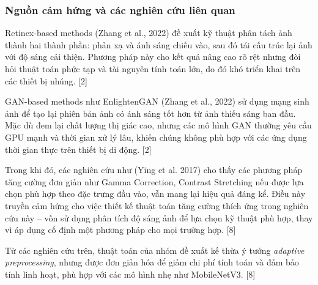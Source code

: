 \subsubsection{Nguồn cảm hứng và các nghiên cứu liên quan} %

Retinex-based methods (Zhang et al., 2022) đề xuất kỹ thuật phân tách ảnh thành hai thành phần: phản xạ và ánh sáng chiếu vào, sau đó tái cấu trúc lại ảnh với độ sáng cải thiện. Phương pháp này cho kết quả nâng cao rõ rệt nhưng đòi hỏi thuật toán phức tạp và tài nguyên tính toán lớn, do đó khó triển khai trên các thiết bị nhúng. [2]

GAN-based methods như EnlightenGAN (Zhang et al., 2022) sử dụng mạng sinh ảnh để tạo lại phiên bản ảnh có ánh sáng tốt hơn từ ảnh thiếu sáng ban đầu. Mặc dù đem lại chất lượng thị giác cao, nhưng các mô hình GAN thường yêu cầu GPU mạnh và thời gian xử lý lâu, khiến chúng không phù hợp với các ứng dụng thời gian thực trên thiết bị di động. [2]

Trong khi đó, các nghiên cứu như (Ying et al. 2017) cho thấy các phương pháp tăng cường đơn giản như Gamma Correction, Contrast Stretching nếu được lựa chọn phù hợp theo đặc trưng đầu vào, vẫn mang lại hiệu quả đáng kể. Điều này truyền cảm hứng cho việc thiết kế thuật toán tăng cường thích ứng trong nghiên cứu này – vốn sử dụng phân tích độ sáng ảnh để lựa chọn kỹ thuật phù hợp, thay vì áp dụng cố định một phương pháp cho mọi trường hợp. [8]

Từ các nghiên cứu trên, thuật toán của nhóm đề xuất kế thừa ý tưởng \textit{adaptive preprocessing}, nhưng được đơn giản hóa để giảm chi phí tính toán và đảm bảo tính linh hoạt, phù hợp với các mô hình nhẹ như MobileNetV3. [8]
